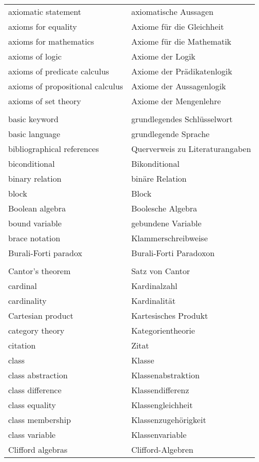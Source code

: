 \begin{longtabu}   { @{} X[l] X[l] }
    axiomatic statement & axiomatische Aussagen \\
    axioms for equality & Axiome für die Gleichheit \\
    axioms for mathematics & Axiome für die Mathematik \\
    axioms of logic & Axiome der Logik \\
    axioms of predicate calculus & Axiome der Prädikatenlogik \\
    axioms of propositional calculus & Axiome der Aussagenlogik \\
    axioms of set theory & Axiome der Mengenlehre \\
     & \\
    basic keyword & grundlegendes Schlüsselwort \\
    basic language & grundlegende Sprache \\
    bibliographical references & Querverweis zu Literaturangaben \\
    biconditional & Bikonditional \\
    binary relation & binäre Relation \\
    block & Block \\
    Boolean algebra & Boolesche Algebra \\
    bound variable & gebundene Variable \\
    brace notation & Klammerschreibweise \\
    Burali-Forti paradox & Burali-Forti Paradoxon \\
     & \\
    Cantor's theorem & Satz von Cantor \\
    cardinal & Kardinalzahl \\
    cardinality & Kardinalität \\
    Cartesian product & Kartesisches Produkt \\
    category theory & Kategorientheorie \\
    citation & Zitat \\
    class & Klasse \\
    class abstraction & Klassenabstraktion \\
    class difference & Klassendifferenz \\
    class equality & Klassengleichheit \\
    class membership & Klassenzugehörigkeit \\
    class variable & Klassenvariable \\
    Clifford algebras & Clifford-Algebren \\

\end{longtabu}
